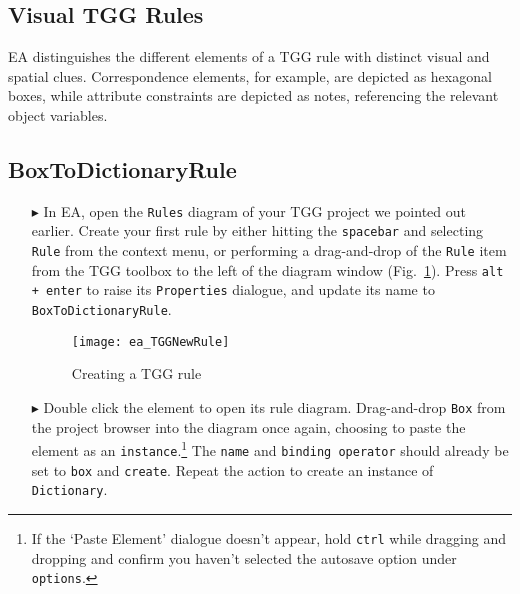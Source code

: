 \newpage
\hypertarget{rules vis}{}
\subsection{Visual TGG Rules}
\visHeader

EA distinguishes the different elements of a TGG rule with distinct visual and spatial clues. Correspondence elements, for example, are depicted as
hexagonal boxes, while attribute constraints are depicted as notes, referencing the relevant object variables.

\subsection{BoxToDictionaryRule}

\begin{enumerate}

\item[$\blacktriangleright$] In EA, open the \texttt{Rules} diagram of your TGG project we pointed out earlier. Create your first rule by either hitting the
\texttt{spacebar} and selecting \texttt{Rule} from the context menu, or performing a drag-and-drop of the \texttt{Rule} item from the TGG toolbox to the left of
the diagram window (Fig.~\ref{ea:create_tgg_rule}). Press \texttt{alt + enter} to raise its \texttt{Properties} dialogue, and update its name to
\texttt{BoxToDictionaryRule}.

\vspace{0.5cm}

\begin{figure}[htbp]
\begin{center}
  \texttt{[image: ea\_TGGNewRule]}
  \caption{Creating a TGG rule}
  \label{ea:create_tgg_rule}
\end{center}
\end{figure}

\vspace{0.5cm}

\item[$\blacktriangleright$] Double click the element to open its rule diagram. Drag-and-drop \texttt{Box} from the project browser into the diagram once
again, choosing to paste the element as an \texttt{instance}.\footnote{If the `Paste Element' dialogue doesn't appear, hold \texttt{ctrl} while dragging and
dropping and confirm you haven't selected the autosave option under \texttt{options}.} The \texttt{name} and \texttt{binding operator} should already be set to
\texttt{box} and \texttt{create}. Repeat the action to create an instance of \texttt{Dictionary}.


\end{enumerate}
